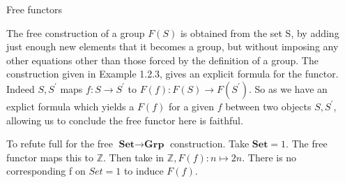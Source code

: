 \documentclass{article}
\begin{document}
Free functors

The free construction of a group $F(S)$ is obtained from the set S, by adding just enough new elements that it becomes a group, but without imposing any other equations other than those forced by the definition of a group. The construction given in Example 1.2.3, gives an explicit formula for the functor. Indeed $S, S^\prime$ maps $f\colon S \rightarrow S^\prime$ to $F(f)\colon F(S) \rightarrow F(S^\prime)$. So as we have an explict formula which yields a $F(f)$ for a given $f$ between two objects $S, S^\prime$, allowing us to conclude the free functor here is faithful.

To refute full for the free $\textbf{Set} \rightarrow \textbf{Grp}$ construction. Take $\mathbf{Set}={1}$. The free functor maps this to $\mathds{Z}$. Then take in $\mathds{Z}, F(f)\colon n \mapsto 2n$. There is no corresponding f on $Set={1}$ to induce $F(f)$.
\end{document}
